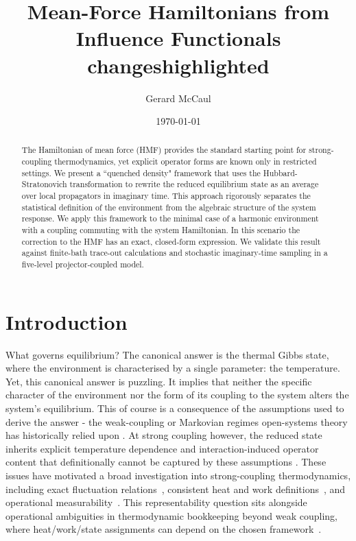 ﻿\documentclass[aps,prl,twocolumn,superscriptaddress,showpacs,floatfix]{revtex4-2}
\begin{document}
\title{Mean-Force Hamiltonians from Influence Functionals\texorpdfstring{\\\large changes\textunderscore highlighted}{ - changes highlighted}}
\author{Gerard McCaul}
\date{\today}

\begin{abstract}
The Hamiltonian of mean force (HMF) provides the standard starting point for strong-coupling thermodynamics, yet explicit operator forms are known only in restricted settings. We present a ``quenched density" framework that uses the Hubbard-Stratonovich transformation to rewrite the reduced equilibrium state as an average over local propagators in imaginary time. This approach rigorously separates the statistical definition of the environment from the algebraic structure of the system response. We apply this framework to the minimal case of a harmonic environment with a coupling commuting with the system Hamiltonian. In this scenario the correction to the HMF has an exact, closed-form expression. We validate this result against finite-bath trace-out calculations and stochastic imaginary-time sampling in a five-level projector-coupled model.
\end{abstract}

\maketitle

\section{\label{sec:intro}Introduction}

What governs equilibrium? The canonical answer is the thermal Gibbs state, where the environment is characterised by a single parameter: the temperature. Yet, this canonical answer is puzzling. It implies that neither the specific character of the environment nor the form of its coupling to the system alters the system's equilibrium. This of course is a consequence of the assumptions used to derive the answer - the weak-coupling or Markovian regimes open-systems theory has historically relied upon \cite{breuerTheoryOpenQuantum2002}. At strong coupling however, the reduced state inherits explicit temperature dependence and interaction-induced operator content that definitionally cannot be captured by these assumptions \cite{hanggiFiniteQuantumDissipation2008,ingoldSpecificHeatAnomalies2009}. These issues have motivated a broad investigation into strong-coupling thermodynamics, including exact fluctuation relations~\cite{campisiFluctuationTheoremArbitrary2009,jarzynskiNonequilibriumWorkTheorem2004,gooldNonequilibriumThermodynamics2019}, consistent heat and work definitions~\cite{espositoNatureHeatStrongly2015,rivasStrongCouplingThermodynamics2020,lacerdaQuantumThermodynamicsFast2023}, and operational measurability~\cite{strasbergMeasurabilityNonequilibriumThermodynamics2020,millerEntropyProduction2017,binderOperationalThermodynamics2019}. This representability question sits alongside operational ambiguities in thermodynamic bookkeeping beyond weak coupling, where heat/work/state assignments can depend on the chosen framework~\cite{BinderVinjanampathyModiGoold2015}. 
\end{document}
